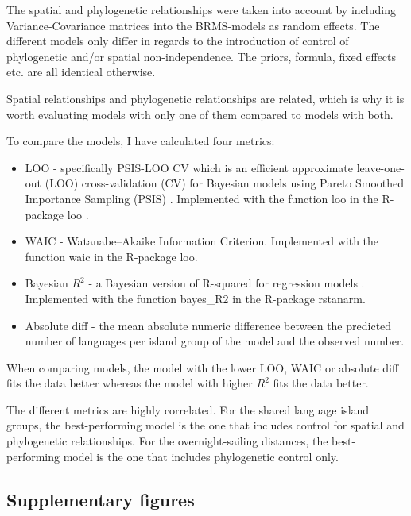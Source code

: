 \documentclass[unnumsec,webpdf,modern,medium]{oup-authoring-template}
\begin{document}
The spatial and phylogenetic relationships were taken into account by including Variance-Covariance matrices into the BRMS-models as random effects. The different models only differ in regards to the introduction of control of phylogenetic and/or spatial non-independence. The priors, formula, fixed effects etc. are all identical otherwise.

Spatial relationships and phylogenetic relationships are related, which is why it is worth evaluating models with only one of them compared to models with both.

To compare the models, I have calculated four metrics:

\begin{itemize}
    \item LOO - specifically PSIS-LOO CV which is an efficient approximate leave-one-out (LOO) cross-validation (CV) for Bayesian models using Pareto Smoothed Importance Sampling (PSIS) . Implemented with the function loo in the R-package loo \citep{R-loo, loo2017a, loo2017b}.
    \item WAIC - Watanabe–Akaike Information Criterion. Implemented with the function waic in the R-package loo.
    \item Bayesian $R^2$ - a Bayesian version of R-squared for regression models \citep{R-brms, brms2017, brms2018, brms2021}. Implemented with the function bayes\_R2 in the R-package rstanarm.
    \item Absolute diff - the mean absolute numeric difference between the predicted number of languages per island group of the model and the observed number.
\end{itemize}

When comparing models, the model with the lower LOO, WAIC or absolute diff fits the data better whereas the model with higher $R^2$ fits the data better. 





The different metrics are highly correlated. For the shared language island groups, the best-performing model is the one that includes control for spatial and phylogenetic relationships. For the overnight-sailing distances, the best-performing model is the one that includes phylogenetic control only.

\newpage
\subsection{Supplementary figures}
\label{appendix_supp_figs}
\end{document}
